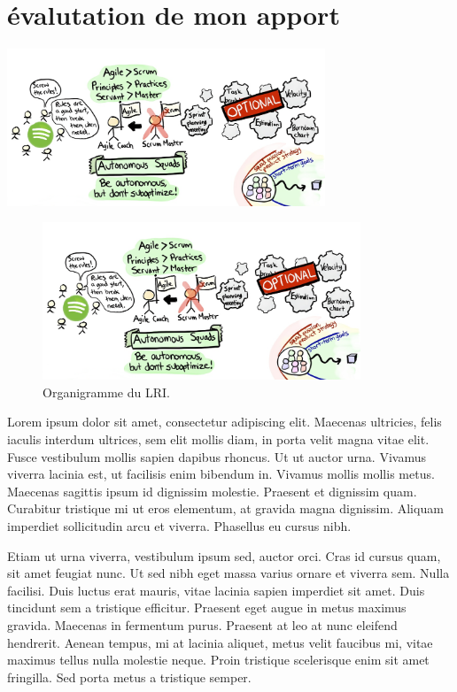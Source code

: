 \chapter{évalutation de mon apport}


\begin{center}
\includegraphics[width=95mm]{./src_img/agile_scrum}
\end{center}

\begin{figure}[htp]
  \centering
  \includegraphics[width=95mm]{./src_img/agile_scrum}
  \caption{Organigramme du LRI.}
  \label{fig:une-autre-image}
\end{figure}




Lorem ipsum dolor sit amet, consectetur adipiscing elit. Maecenas ultricies, felis iaculis interdum ultrices, sem elit mollis diam, in porta velit magna vitae elit. Fusce vestibulum mollis sapien dapibus rhoncus. Ut ut auctor urna. Vivamus viverra lacinia est, ut facilisis enim bibendum in. Vivamus mollis mollis metus. Maecenas sagittis ipsum id dignissim molestie. Praesent et dignissim quam. Curabitur tristique mi ut eros elementum, at gravida magna dignissim. Aliquam imperdiet sollicitudin arcu et viverra. Phasellus eu cursus nibh.

Etiam ut urna viverra, vestibulum ipsum sed, auctor orci. Cras id cursus quam, sit amet feugiat nunc. Ut sed nibh eget massa varius ornare et viverra sem. Nulla facilisi. Duis luctus erat mauris, vitae lacinia sapien imperdiet sit amet. Duis tincidunt sem a tristique efficitur. Praesent eget augue in metus maximus gravida. Maecenas in fermentum purus. Praesent at leo at nunc eleifend hendrerit. Aenean tempus, mi at lacinia aliquet, metus velit faucibus mi, vitae maximus tellus nulla molestie neque. Proin tristique scelerisque enim sit amet fringilla. Sed porta metus a tristique semper.

